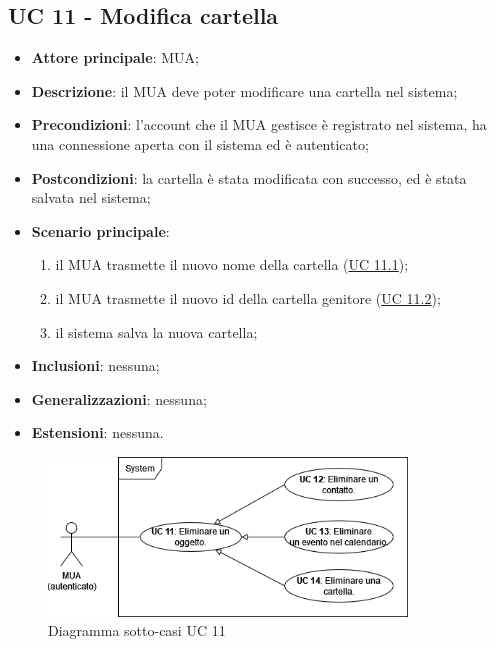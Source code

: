 \subsection{UC 11 - Modifica cartella} \label{sec:UC11}
\begin{itemize}
    \item \textbf{Attore principale}: MUA;
    \item \textbf{Descrizione}: il MUA deve poter modificare una cartella nel sistema;
    \item \textbf{Precondizioni}: l’account che il MUA gestisce è registrato nel sistema, ha una connessione aperta con il sistema ed è autenticato;
    \item \textbf{Postcondizioni}: la cartella è stata modificata con successo, ed è stata salvata nel sistema;
    \item \textbf{Scenario principale}:
        \begin{enumerate}
            \item il MUA trasmette il nuovo nome della cartella (\hyperref[sec:UC11.1]{UC 11.1});
            \item il MUA trasmette il nuovo id della cartella genitore (\hyperref[sec:UC11.2]{UC 11.2});
            \item il sistema salva la nuova cartella;
        \end{enumerate}
    \item \textbf{Inclusioni}: nessuna;
    \item \textbf{Generalizzazioni}: nessuna;
    \item \textbf{Estensioni}: nessuna.
\end{itemize}

\begin{figure}[H]
    \includegraphics[width=0.85\textwidth]{sections/uc_imgs/UC11.png}
    \centering
    \caption{Diagramma sotto-casi UC 11}
\end{figure}

